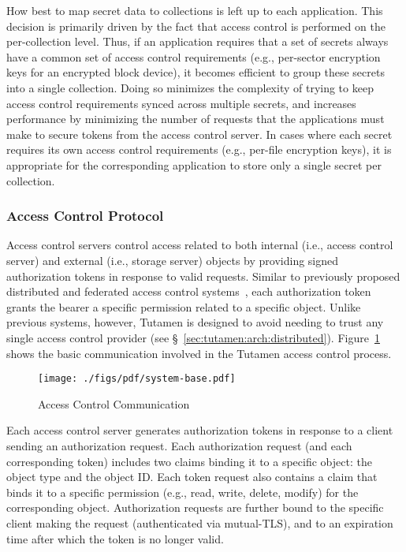 How best to map secret data to collections is left up to each
application. This decision is primarily driven by the fact that access
control is performed on the per-collection level. Thus, if an
application requires that a set of secrets always have a common set of
access control requirements (e.g., per-sector encryption keys for an
encrypted block device), it becomes efficient to group these secrets
into a single collection. Doing so minimizes the complexity of trying
to keep access control requirements synced across multiple secrets,
and increases performance by minimizing the number of requests that
the applications must make to secure tokens from the access control
server. In cases where each secret requires its own access control
requirements (e.g., per-file encryption keys), it is appropriate for
the corresponding application to store only a single secret per
collection.

\subsubsection{Access Control Protocol}
\label{sec:tutamen:arch:acp}

Access control servers control access related to both internal
(i.e., access control server) and external (i.e., storage server)
objects by providing signed authorization tokens in response to valid
requests. Similar to previously proposed distributed and federated
access control systems~\cite{Calero2010, Leandro2012},
each authorization token grants the bearer a specific permission
related to a specific object. Unlike previous systems, however,
Tutamen is designed to avoid needing to trust any single access
control provider (see \S~\ref{sec:tutamen:arch:distributed}).
Figure~\ref{fig:tutamen:systembase} shows the basic communication
involved in the Tutamen access control process.

\begin{figure}[th]
  \centering
  \texttt{[image: ./figs/pdf/system-base.pdf]}
  \caption{Access Control Communication}
  \label{fig:tutamen:systembase}
\end{figure}

Each access control server generates authorization tokens in response
to a client sending an authorization request. Each authorization
request (and each corresponding token) includes two claims binding it
to a specific object: the object type and the object ID. Each token
request also contains a claim that binds it to a specific permission
(e.g., read, write, delete, modify) for the corresponding
object. Authorization requests are further bound to the specific
client making the request (authenticated via mutual-TLS), and to an
expiration time after which the token is no longer valid.

